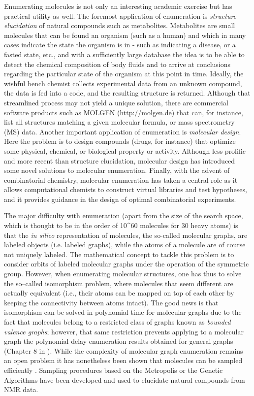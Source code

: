 \documentclass{sig-alternate}
\begin{document}
Enumerating molecules is not only an interesting academic exercise but has
practical utility as well. The foremost application of enumeration is \emph{structure
elucidation} of natural compounds such as metabolites. Metabolites are small molecules that can be found an organism (such as a human) and which in many cases indicate the state the organism is in - such as indicating a disease, or a fasted state, etc., and with a sufficiently large database the idea is to be able to detect the chemical composition of body fluids and to arrive at conclusions regarding the particular state of the organism at this point in time.
Ideally, the wishful bench chemist collects experimental data
from an unknown compound, the data is fed into a code, and the resulting
structure is returned. Although that streamlined process may not yield a unique
solution, there are commercial software products such as MOLGEN
(http://molgen.de) that can, for instance, list all structures matching a given
molecular formula, or mass spectrometry (MS) data. Another important application
of enumeration is \emph{molecular design}. Here the problem is to design compounds
(drugs, for instance) that optimize some physical, chemical, or biological
property or activity. Although less prolific and more recent than structure
elucidation, molecular design has introduced some novel solutions to molecular
enumeration. Finally, with the advent of combinatorial chemistry, molecular
enumeration has taken a central role as it allows computational chemists to
construct virtual libraries and test hypotheses, and it provides guidance in the
design of optimal combinatorial experiments.

The major difficulty with enumeration (apart from the size of the search space, which is thought to be in the order of 10^60 molecules for 30 heavy atoms) is that the \emph{in silico}
representation of molecules, the so-called molecular graphs, are
labeled objects (i.e. labeled graphs), while the atoms of a molecule
are of course not uniquely labeled. The mathematical concept to tackle
this problem is to consider orbits of labeled molecular graphs under
the operation of the symmetric group. However, when enumerating molecular
structures, one has thus to solve the so--called isomorphism problem, where molecules that seem different are actually equivalent (i.e., their atoms can be mapped on top of each other by keeping the connectivity between atoms intact).
The good news is that isomorphism can be solved in polynomial time for
molecular graphs due to the fact that molecules belong to a restricted
class of graphs known as \emph{bounded valence graphs}; however, that
same restriction prevents applying to a molecular graph the polynomial
delay enumeration results obtained for general graphs (Chapter 8 in
\cite{faulon2010}). While the complexity of molecular graph
enumeration remains an open problem it has nonetheless been shown that
molecules can be sampled efficiently \cite{goldberg1999}. Sampling
procedures based on the Metropolis or the Genetic Algorithms have been
developed and used to elucidate natural compounds from NMR data.
\end{document}
